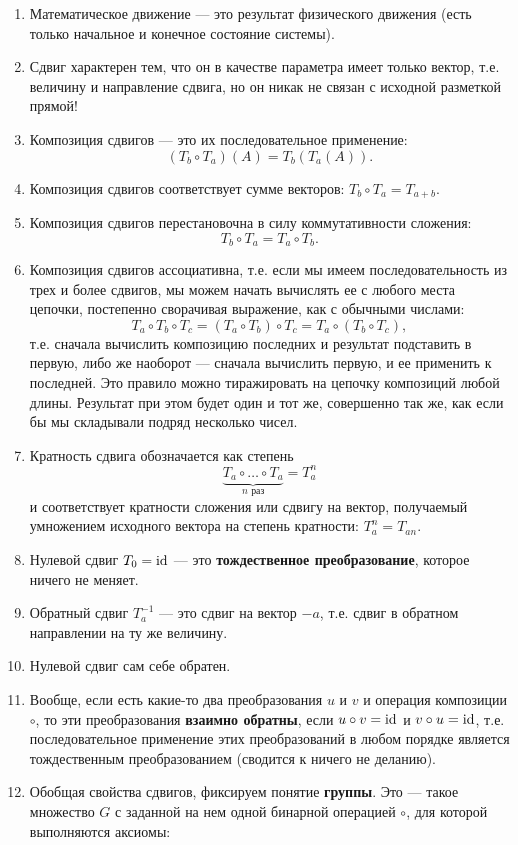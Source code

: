 \begin{enumerate}
\item Математическое движение --- это результат физического движения (есть только начальное и конечное состояние системы).
\item Сдвиг характерен тем, что он в качестве параметра имеет только вектор, т.е. величину и направление сдвига, но он никак не связан с исходной разметкой прямой!
\item Композиция сдвигов --- это их последовательное применение: $$(T_b\circ T_a)(A)=T_b(T_a(A)).$$
\item Композиция сдвигов соответствует сумме векторов: $T_b\circ T_a=T_{a+b}$.
\item Композиция сдвигов перестановочна в силу коммутативности сложения: $$T_b\circ T_a=T_a\circ T_b.$$
\item Композиция сдвигов ассоциативна, т.е. если мы имеем последовательность из трех и более сдвигов, мы можем начать вычислять ее с любого места цепочки, постепенно сворачивая выражение, как с обычными числами:
$$
T_a\circ T_b\circ T_c = (T_a\circ T_b)\circ T_c = T_a\circ (T_b\circ T_c),
$$
т.е. сначала вычислить композицию последних и результат подставить в первую, либо же наоборот --- сначала вычислить первую, и ее применить к последней. Это правило можно тиражировать на цепочку композиций любой длины. Результат при этом будет один и тот же, совершенно так же, как если бы мы складывали подряд несколько чисел.
\item Кратность сдвига обозначается как степень
$$
\underbrace{T_a\circ\dots\circ T_a}_{n\mbox{ раз}}=T_a^n
$$
и соответствует кратности сложения или сдвигу на вектор, получаемый умножением исходного вектора на степень кратности: $T_a^n=T_{an}$.
\item Нулевой сдвиг $T_0=\mathrm{id}$ --- это \textbf{тождественное преобразование}, которое ничего не меняет.
\item Обратный сдвиг $T_a^{-1}$ --- это сдвиг на вектор $-a$, т.е. сдвиг в обратном направлении на ту же величину.
\item Нулевой сдвиг сам себе обратен.
\item Вообще, если есть какие-то два преобразования $u$ и $v$ и операция композиции $\circ$, то эти преобразования \textbf{взаимно обратны}, если $u\circ v=\mathrm{id}$ и $v\circ u=\mathrm{id}$, т.е. последовательное применение этих преобразований в любом порядке является тождественным преобразованием (сводится к ничего не деланию).
\item Обобщая свойства сдвигов, фиксируем понятие \textbf{группы}. Это --- такое множество $G$ с заданной на нем одной бинарной операцией $\circ$, для которой выполняются аксиомы:

\end{enumerate}
